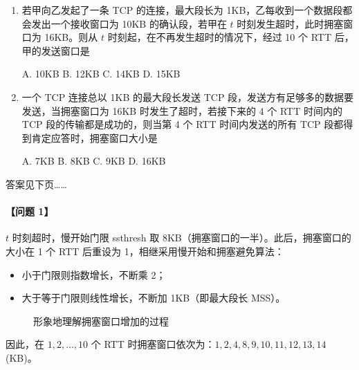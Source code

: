 \documentclass[UTF8]{ctexart}
\begin{document}
{\color{cyan!50!black}
\begin{enumerate}
  \item 若甲向乙发起了一条 TCP 的连接，最大段长为 1KB，乙每收到一个数据段都会发出一个接收窗口为 10KB 的确认段，若甲在 $t$ 时刻发生超时，此时拥塞窗口为 16KB。则从 $t$ 时刻起，在不再发生超时的情况下，经过 10 个 RTT 后，甲的发送窗口是

      A. 10KB \hfill B. 12KB \hfill C. 14KB \hfill D. 15KB \hfill

  \item 一个 TCP 连接总以 1KB 的最大段长发送 TCP 段，发送方有足够多的数据要发送，当拥塞窗口为 16KB 时发生了超时，若接下来的 4 个 RTT 时间内的 TCP 段的传输都是成功的，则当第 4 个 RTT 时间内发送的所有 TCP 段都得到肯定应答时，拥塞窗口大小是

      A. 7KB \hfill B. 8KB \hfill C. 9KB \hfill D. 16KB \hfill
\end{enumerate}
}

答案见下页……

\newpage

\paragraph{【问题 1】}
$t$ 时刻超时，慢开始门限 ssthresh 取 8KB（拥塞窗口的一半）。此后，拥塞窗口的大小在 1 个 RTT 后重设为 1，相继采用慢开始和拥塞避免算法：
\begin{itemize}[itemsep=0pt,parsep=0pt]
  \item 小于门限则指数增长，不断乘 2；
  \item 大于等于门限则线性增长，不断加 1KB（即最大段长 MSS）。
\end{itemize}

\begin{figure}[htb]
    \centering
    \caption{形象地理解拥塞窗口增加的过程}\label{fig:1}
\end{figure}
因此，在 $1,2,\dots,10$ 个 RTT 时拥塞窗口依次为：$1,2,4,8,9,10,11,12,13,14$(KB)。
\end{document}
